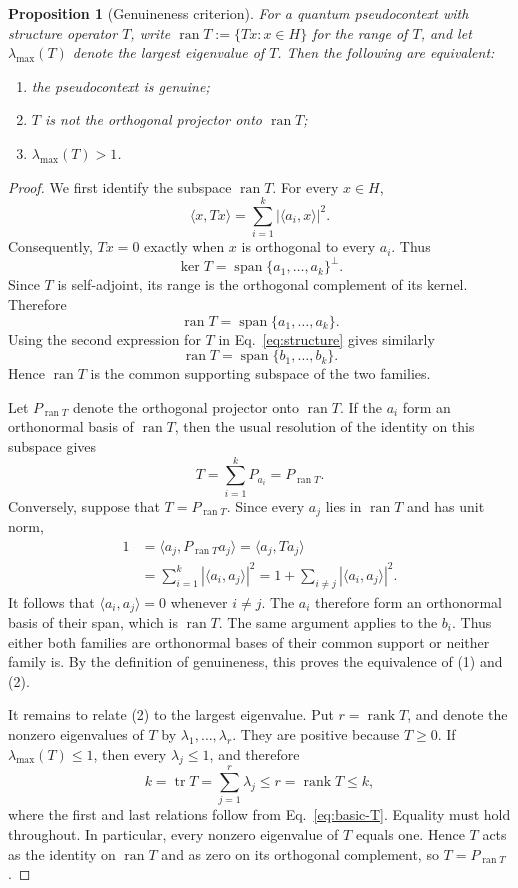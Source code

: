 \documentclass[
  twocolumn,
  aps,
  pra,
  floatfix,
  amsmath,amssymb,
  longbibliography
]{revtex4-2}
\newtheorem{proposition}[theorem]{Proposition}
\theoremstyle{definition}
\theoremstyle{remark}
\newcommand{\ran}{\operatorname{ran}}
\newcommand{\Tr}{\operatorname{tr}}
\newcommand{\1}{\mathbf 1}
\begin{document}
\begin{proposition}[Genuineness criterion]
\label{prop:genuine}
For a quantum pseudocontext with structure operator $T$, write
$\ran T:=\{Tx:x\in H\}$ for the range of $T$, and let
$\lambda_{\max}(T)$ denote the largest eigenvalue of $T$.  Then the following
are equivalent:
\begin{enumerate}
 \item the pseudocontext is genuine;
 \item $T$ is not the orthogonal projector onto $\ran T$;
 \item $\lambda_{\max}(T)>1$.
\end{enumerate}
\end{proposition}

\begin{proof}
We first identify the subspace $\ran T$.  For every $x\in H$,
\[
 \langle x,Tx\rangle
 =\sum_{i=1}^{k}|\langle a_i,x\rangle|^2.
\]
Consequently, $Tx=0$ exactly when $x$ is orthogonal to every $a_i$.  Thus
\[
 \ker T=\operatorname{span}\{a_1,\ldots,a_k\}^{\perp}.
\]
Since $T$ is self-adjoint, its range is the orthogonal complement of its
kernel.  Therefore
\[
 \ran T=\operatorname{span}\{a_1,\ldots,a_k\}.
\]
Using the second expression for $T$ in Eq.~\eqref{eq:structure} gives
similarly
\[
 \ran T=\operatorname{span}\{b_1,\ldots,b_k\}.
\]
Hence $\ran T$ is the common supporting subspace of the two families.

Let $P_{\ran T}$ denote the orthogonal projector onto $\ran T$.  If the
$a_i$ form an orthonormal basis of $\ran T$, then the usual resolution of
the identity on this subspace gives
\[
 T=\sum_{i=1}^{k}P_{a_i}=P_{\ran T}.
\]
Conversely, suppose that $T=P_{\ran T}$.  Since every $a_j$ lies in
$\ran T$ and has unit norm,
\begin{align*}
 1
 &=\langle a_j,P_{\ran T}a_j\rangle
  =\langle a_j,Ta_j\rangle\\
 &=\sum_{i=1}^{k}|\langle a_i,a_j\rangle|^2
  =1+\sum_{i\ne j}|\langle a_i,a_j\rangle|^2.
\end{align*}
It follows that $\langle a_i,a_j\rangle=0$ whenever $i\ne j$.  The $a_i$
therefore form an orthonormal basis of their span, which is $\ran T$.
The same argument applies to the $b_i$.  Thus either both families are
orthonormal bases of their common support or neither family is.  By the
definition of genuineness, this proves the equivalence of (1) and (2).

It remains to relate (2) to the largest eigenvalue.  Put
$r=\operatorname{rank}T$, and denote the nonzero eigenvalues of $T$ by
$\lambda_1,\ldots,\lambda_r$.  They are positive because $T\ge0$.  If
$\lambda_{\max}(T)\le1$, then every $\lambda_j\le1$, and therefore
\[
 k=\Tr T=\sum_{j=1}^{r}\lambda_j\le r
   =\operatorname{rank}T\le k,
\]
where the first and last relations follow from Eq.~\eqref{eq:basic-T}.
Equality must hold throughout.  In particular, every nonzero eigenvalue of
$T$ equals one.  Hence $T$ acts as the identity on $\ran T$ and as zero on
its orthogonal complement, so $T=P_{\ran T}$.


\end{proof}
\end{document}
